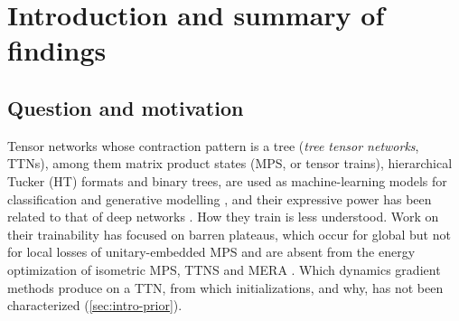 \section{Introduction and summary of findings}\label{sec:intro}

\subsection{Question and motivation}\label{sec:intro-question}


Tensor networks whose contraction pattern is a tree (\emph{tree tensor networks}, TTNs), among them
matrix product states (MPS, or tensor trains), hierarchical Tucker (HT) formats and binary trees, are
used as machine-learning models for classification and generative modelling
\citep{stoudenmire2016supervised,novikov2018exponential,han2018unsupervised,stoudenmire2018learning,%
cheng2019tree,liu2019machine,glasser2019expressive}, and their expressive power has been related to
that of deep networks \citep{cohen2016expressive,levine2018deep}. How they train is less understood.
Work on their trainability has focused on barren plateaus, which occur for global but not for local
losses of unitary-embedded MPS \citep{liu2022presence} and are absent from the energy optimization of
isometric MPS, TTNS and MERA \citep{miao2024isometric,barthel2025absence}. Which dynamics gradient
methods produce on a TTN, from which initializations, and why, has not been characterized
(\cref{sec:intro-prior}).

